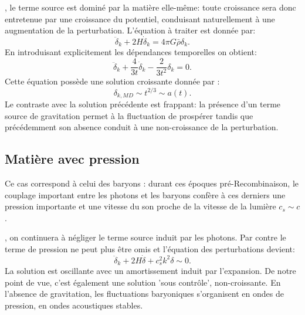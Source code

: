 , le terme source est dominé par la matière elle-même: toute croissance sera donc entretenue par une croissance du potentiel, conduisant naturellement à une augmentation de la perturbation. L'équation à traiter est donnée par:
\begin{equation}
\ddot \delta_k +2 H \dot \delta_k =4\pi G \bar\rho \delta_k.
\end{equation}
En introduisant explicitement les dépendances temporelles on obtient:
\begin{equation}
\ddot \delta_k +\frac{4}{3t}\dot \delta_k - \frac{2}{3t^2}\delta_k=0.
\end{equation}
Cette équation possède une solution croissante donnée par  :
\begin{equation}
\delta_{k,MD}\sim t^{2/3}\sim a(t).
\end{equation}
Le contraste avec la solution précédente est frappant: la présence d'un terme source de gravitation permet à la fluctuation de prospérer tandis que précédemment son absence conduit à une non-croissance de la perturbation.

\subsection{Matière avec pression}
Ce cas correspond à celui des baryons : durant ces époques pré-Recombinaison, le couplage important entre les photons et les baryons confère à ces derniers une pression importante et une vitesse du son proche de la vitesse de la lumière $c_s\sim c$.

, on continuera à négliger le terme source induit par les photons. Par contre le terme de pression ne peut plus être omis et l'équation des perturbations devient:
\begin{equation}
\ddot \delta_k+2H\dot \delta +c_s^2k^2 \delta \sim 0.
\end{equation}
La solution est oscillante avec un amortissement induit par l'expansion. De notre point de vue, c'est également une solution 'sous contrôle', non-croissante. En l'absence de gravitation, les fluctuations baryoniques s'organisent en ondes de pression, en ondes acoustiques stables.

